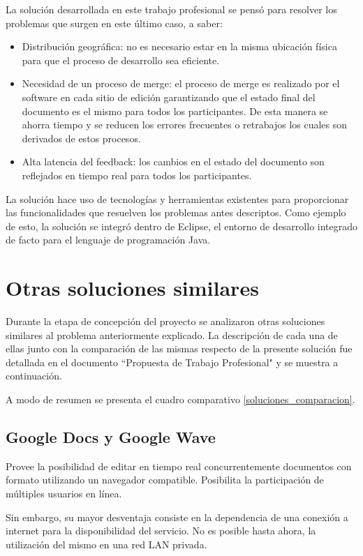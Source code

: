 \documentclass[12pt,a4paper]{article}
\let\stdsection\section
\renewcommand\section{\newpage\stdsection}
\begin{document}
La solución desarrollada en este trabajo profesional se pensó para resolver los problemas que surgen
en este último caso, a saber:

\begin{itemize}
	\item Distribución geográfica: no es necesario estar en la misma ubicación física para que el proceso
	de desarrollo sea eficiente.
	\item Necesidad de un proceso de merge: el proceso de merge es realizado por el software en cada
	sitio de edición garantizando que el estado final del documento es el mismo para todos los 
	participantes. De esta manera se ahorra tiempo y se reducen los errores frecuentes o retrabajos
	los cuales son derivados de estos procesos.
	\item Alta latencia del feedback: los cambios en el estado del documento son reflejados en tiempo 
	real para todos los participantes.
\end{itemize}

La solución hace uso de tecnologías y herramientas existentes para proporcionar las funcionalidades 
que resuelven los problemas antes descriptos. Como ejemplo de esto, la solución se integró dentro de
Eclipse, el entorno de desarrollo integrado de facto para el lenguaje de programación Java.

	\section{Otras soluciones similares}
Durante la etapa de concepción del proyecto se analizaron otras soluciones similares al problema
anteriormente explicado. La descripción de cada una de ellas junto con la comparación de las mismas
respecto de la presente solución fue detallada en el documento ``Propuesta de Trabajo Profesional" 
\cite{propuestatpprof} y se muestra a continuación.

A modo de resumen se presenta el cuadro comparativo \ref{soluciones_comparacion}.

	\subsection{Google Docs \cite{googledocs} y Google Wave \cite{googlewave}}

Provee la posibilidad de editar en tiempo real concurrentemente documentos con formato utilizando
un navegador compatible. Posibilita la participación de múltiples usuarios en línea.

Sin embargo, su mayor desventaja consiste en la dependencia de una conexión a internet para la
disponibilidad del servicio. No es posible hasta ahora, la utilización del mismo en una red LAN privada.
\end{document}
